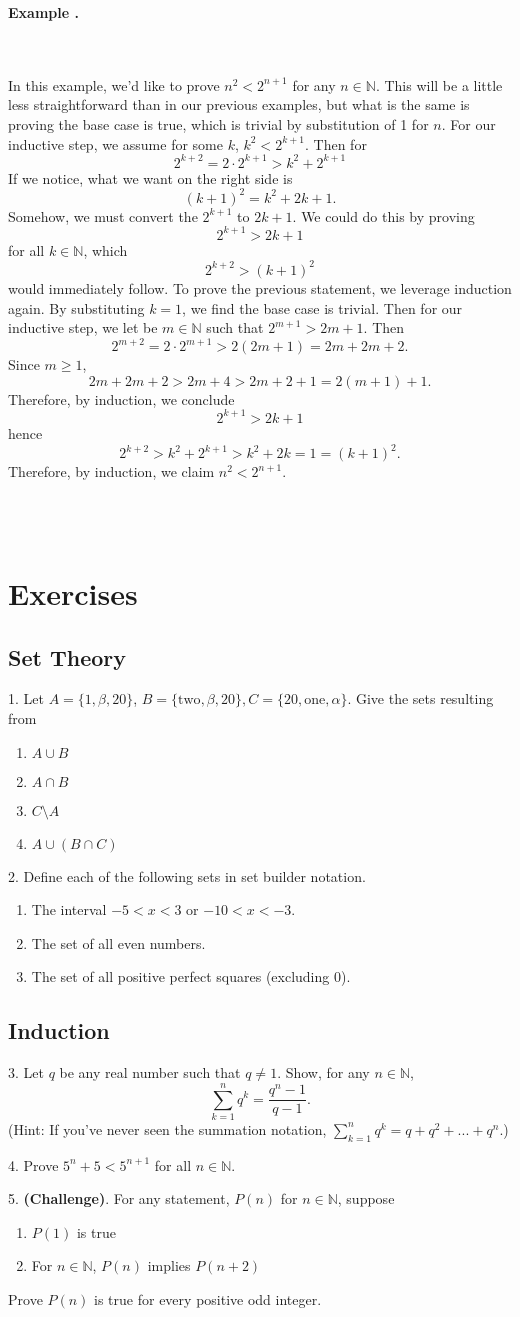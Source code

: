 \documentclass[11pt]{article}
\numberwithin{lemma}{section}
\numberwithin{equation}{section}
\numberwithin{define}{section}
\numberwithin{prop}{section}
\numberwithin{figure}{section}
\numberwithin{theorem}{section}
\newcounter{ex}[section]
\newenvironment{ex}[0]{

	\refstepcounter{ex}
	\begin{large}
    \textbf{Example \theex .}
    \end{large}\\\\
    }
    {
    \\\\
    }
\numberwithin{ex}{section}
\def\nat{\mathbb{N}}
\begin{document}
\begin{ex}
	In this example, we'd like to prove $n^2<2^{n+1}$ for any $n\in\nat$. This will be a little less straightforward than in our previous examples, but what is the same is proving the base case is true, which is trivial by substitution of 1 for $n$. For our inductive step, we assume for some $k$, $k^2<2^{k+1}$. Then for
	$$2^{k+2}=2\cdot 2^{k+1}>k^2+2^{k+1}$$
	If we notice, what we want on the right side is 
	$$(k+1)^2=k^2+2k+1.$$
	Somehow, we must convert the $2^{k+1}$ to $2k+1$. We could do this by proving 
	$$2^{k+1}>2k+1$$ 
	for all $k\in\nat$, which 
	$$2^{k+2}>(k+1)^2$$ 
	would immediately follow.
	To prove the previous statement, we leverage induction again. By substituting $k=1$, we find the base case is trivial. Then for our inductive step, we let be $m\in\nat$ such that $2^{m+1}>2m+1$.
	Then
	$$2^{m+2}=2\cdot2^{m+1}>2(2m+1)=2m+2m+2.$$
	Since $m\ge 1$,
	$$2m+2m+2>2m+4>2m+2+1=2(m+1)+1.$$
	Therefore, by induction, we conclude 
	$$2^{k+1}>2k+1$$
	hence
	$$2^{k+2}>k^2+2^{k+1}>k^2+2k=1=(k+1)^2.$$
	Therefore, by induction, we claim $n^2<2^{n+1}$.
\end{ex}

\section{Exercises}
\subsection{Set Theory}
1. Let $A=\{1,\beta,20\}$, $B=\{\text{two},\beta,20\},C=\{20,\text{one},\alpha\}$. Give the sets resulting from
\begin{enumerate}[label=\alph*)]
	\item $A \cup B$
	\item $A \cap B$
	\item $C \setminus A$
	\item $A \cup (B\cap C)$
\end{enumerate}
2. Define each of the following sets in set builder notation.
\begin{enumerate}[label=\alph*)]
	\item The interval $-5<x<3$ or $-10<x<-3$.
	\item The set of all even numbers.
	\item The set of all positive perfect squares (excluding 0).
\end{enumerate}
\subsection{Induction}
3. Let $q$ be any real number such that $q\neq1$. Show, for any $n\in\nat$,
$$\sum_{k=1}^nq^k=\frac{q^n-1}{q-1}.$$
(Hint: If you've never seen the summation notation, $\sum_{k=1}^nq^k=q+q^2+...+q^n$.)

4. Prove $5^n+5<5^{n+1}$ for all $n\in\nat$.

5. \textbf{(Challenge)}. For any statement, $P(n)$ for $n\in\nat$, suppose 
\begin{enumerate}
	\item $P(1)$ is true
	\item For $n\in\nat$, $P(n)$ implies $P(n+2)$
\end{enumerate}
Prove $P(n)$ is true for every positive odd integer. 
\end{document}
